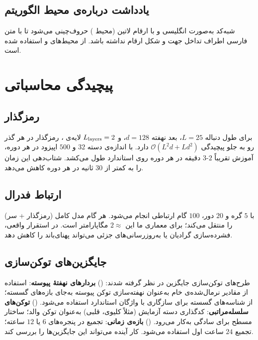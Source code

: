 \subsection{یادداشت درباره‌ی محیط الگوریتم}

شبه‌کد به‌صورت انگلیسی و با ارقام لاتین (محیط \texttt{}) حروف‌چینی می‌شود تا با متن فارسی اطراف تداخل جهت و شکل ارقام نداشته باشد. از محیط‌های \texttt{} و \texttt{} استفاده شده است.

\section{پیچیدگی محاسباتی}

\subsection{رمزگذار }

برای طول دنباله $L=25$، بعد نهفته $d=128$، و $L_{\text{layers}}=2$ لایه‌ی ، رمزگذار در هر گذر رو به جلو پیچیدگی $\mathcal{O}(L^2 d + L d^2)$ دارد. با اندازه‌ی دسته $32$ و $500$ اپیزود در هر دوره، آموزش تقریباً $2$-$3$ دقیقه در هر دوره روی  استاندارد طول می‌کشد. شتاب‌دهی  این زمان را به کمتر از $30$ ثانیه در هر دوره کاهش می‌دهد.

\subsection{ارتباط فدرال}

با $5$ گره و $20$ دور، $100$ گام ارتباطی انجام می‌شود. هر گام مدل کامل (رمزگذار + سر) را منتقل می‌کند؛ برای معماری ما این $\approx$$2$ مگاپارامتر است. در استقرار واقعی، فشرده‌سازی گرادیان یا به‌روزرسانی‌های جزئی می‌تواند پهنای‌باند را کاهش دهد.

\subsection{جایگزین‌های توکن‌سازی}

طرح‌های توکن‌سازی جایگزین در نظر گرفته شدند: () \textbf{بردارهای نهفتۀ پیوسته}: استفاده از مقادیر نرمال‌شده‌ی خام به‌عنوان نهفته‌سازی توکن پیوسته به‌جای بازه‌های گسسته؛ از شناسه‌های گسسته برای سازگاری با واژگان استاندارد  استفاده می‌شود. () \textbf{توکن‌های سلسله‌مراتبی}: کدگذاری دسته آزمایش (مثلاً کلیوی، قلبی) به‌عنوان توکن والد؛ ساختار مسطح برای سادگی به‌کار می‌رود. () \textbf{بازه‌ی زمانی}: تجمیع در پنجره‌های $6$ یا $12$ ساعته؛ تجمیع $24$ ساعت اول استفاده می‌شود. کار آینده می‌تواند این جایگزین‌ها را بررسی کند.

